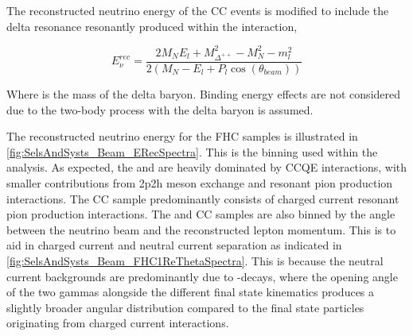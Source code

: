 The reconstructed neutrino energy of the CC\quickmath{1\pi^{+}} events is modified to include the delta resonance resonantly produced within the interaction,

\begin{equation}
  \label{sec:SelsAndSysts_Erec_CCRES}
  E^{rec}_{\nu} = \frac{2M_{N}E_{l} + M_{\Delta^{++}}^{2} - M_{N}^{2} - m_{l}^{2}}{2(M_{N} - E_{l} + P_{l}\cos(\theta_{beam}))}
\end{equation}

Where  is the mass of the delta baryon. Binding energy effects are not considered due to the two-body process with the delta baryon is assumed.

The reconstructed neutrino energy for the FHC samples is illustrated in \autoref{fig:SelsAndSysts_Beam_ERecSpectra}. This is the binning used within the analysis. As expected, the  and  are heavily dominated by CCQE interactions, with smaller contributions from 2p2h meson exchange and resonant pion production interactions. The CC\quickmath{1\pi^{+}} sample predominantly consists of charged current resonant pion production interactions. The  and CC\quickmath{1\pi^{+}} samples are also binned by the angle between the neutrino beam and the reconstructed lepton momentum. This is to aid in charged current and neutral current separation as indicated in \autoref{fig:SelsAndSysts_Beam_FHC1ReThetaSpectra}. This is because the neutral current backgrounds are predominantly due to -decays, where the opening angle of the two gammas alongside the different final state kinematics produces a slightly broader angular distribution compared to the final state particles originating from charged current  interactions.

